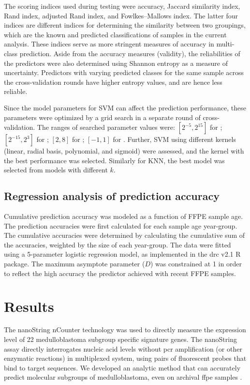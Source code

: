 The scoring indices used during testing were accuracy, Jaccard similarity index, Rand index, adjusted Rand index, and Fowlkes–Mallows index. The latter four indices are different indices for determining the similarity between
two groupings, which are the known and predicted classifications of samples in the current analysis. These indices serve as more stringent measures of accuracy in multi-class prediction. Aside from the accuracy measures (validity),
the reliabilities of the predictors were also determined using Shannon entropy as a measure of uncertainty. Predictors with varying predicted classes for the same sample across the cross-validation rounds have higher entropy values, and are hence less reliable.

Since the model parameters for SVM can affect the prediction performance, these parameters were optimized by a grid search in a separate round of cross-validation. The ranges of searched parameter values were: $[2^{-5}, 2^{15}]$ for ; $[2^{-15}, 2^3]$ for ; $[2, 8]$ for ; $[-1, 1]$ for . Further, SVM using different kernels (linear, radial basis, polynomial, and sigmoid) were assessed, and the kernel with the best performance was selected. Similarly for KNN, the best model was selected from models with different $k$.

\subsection{Regression analysis of prediction accuracy}

Cumulative prediction accuracy was modeled as a function of FFPE sample age. The prediction accuracies were first calculated for each sample age year-group. The cumulative accuracies were determined by calculating the cumulative sum of the accuracies, weighted by the size of each year-group. The data were fitted using a 5-parameter logistic regression model, as implemented in the drc v2.1 R package. The maximum asymptote parameter ($D$) was constrained at 1 in order to reflect the high accuracy the predictor achieved with recent FFPE samples.


\section{Results}

The nanoString nCounter technology  was used to directly measure the expression level of 22 medulloblastoma subgroup specific signature genes. The nanoString assay directly interrogates nucleic acid levels without \gls{pcr} amplification (or other enzymatic reactions) in multiplexed system, using pairs of fluorescent probes that bind to target sequences. We developed an analytic method that can accurately predict molecular subgroups of medulloblastoma, even on archival \gls{ffpe} samples .

